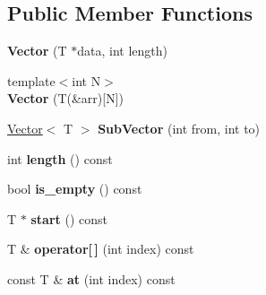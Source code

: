 \subsection*{Public Member Functions}
\begin{DoxyCompactItemize}
\item 
{\bfseries Vector} (T $\ast$data, int length)\hypertarget{classv8_1_1internal_1_1_vector_ab47ce496195ef09e6e7fe8d9770d8833}{}\label{classv8_1_1internal_1_1_vector_ab47ce496195ef09e6e7fe8d9770d8833}

\item 
{\footnotesize template$<$int N$>$ }\\{\bfseries Vector} (T(\&arr)\mbox{[}N\mbox{]})\hypertarget{classv8_1_1internal_1_1_vector_a6605fb887d3a2e0df3742ce7686036dd}{}\label{classv8_1_1internal_1_1_vector_a6605fb887d3a2e0df3742ce7686036dd}

\item 
\hyperlink{classv8_1_1internal_1_1_vector}{Vector}$<$ T $>$ {\bfseries Sub\+Vector} (int from, int to)\hypertarget{classv8_1_1internal_1_1_vector_a44a2e5352bc702d3b06fab45bab93be2}{}\label{classv8_1_1internal_1_1_vector_a44a2e5352bc702d3b06fab45bab93be2}

\item 
int {\bfseries length} () const \hypertarget{classv8_1_1internal_1_1_vector_a445fffd2824071aed691ef4486c100d1}{}\label{classv8_1_1internal_1_1_vector_a445fffd2824071aed691ef4486c100d1}

\item 
bool {\bfseries is\+\_\+empty} () const \hypertarget{classv8_1_1internal_1_1_vector_ac54ecbed441a0cae8e6c585c305fd96e}{}\label{classv8_1_1internal_1_1_vector_ac54ecbed441a0cae8e6c585c305fd96e}

\item 
T $\ast$ {\bfseries start} () const \hypertarget{classv8_1_1internal_1_1_vector_a7b6e8d56f87dad2de500125b16ff607b}{}\label{classv8_1_1internal_1_1_vector_a7b6e8d56f87dad2de500125b16ff607b}

\item 
T \& {\bfseries operator\mbox{[}$\,$\mbox{]}} (int index) const \hypertarget{classv8_1_1internal_1_1_vector_ab8edc8d98f6111850fbc8120f055acc3}{}\label{classv8_1_1internal_1_1_vector_ab8edc8d98f6111850fbc8120f055acc3}

\item 
const T \& {\bfseries at} (int index) const \hypertarget{classv8_1_1internal_1_1_vector_a8a136b2239755e011fb8214cd0972eda}{}\label{classv8_1_1internal_1_1_vector_a8a136b2239755e011fb8214cd0972eda}


\end{DoxyCompactItemize}
